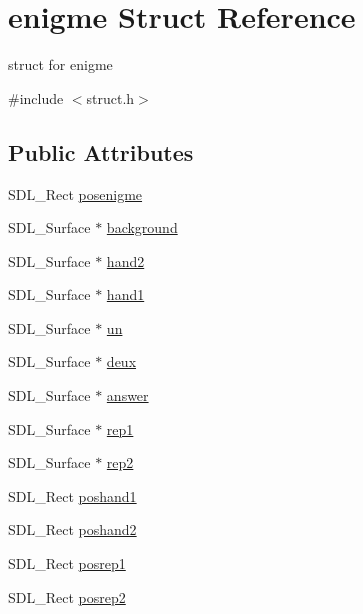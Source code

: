 \hypertarget{structenigme}{}\section{enigme Struct Reference}
\label{structenigme}


struct for enigme  




{\ttfamily \#include $<$struct.\+h$>$}

\subsection*{Public Attributes}
\begin{DoxyCompactItemize}
\item 
S\+D\+L\+\_\+\+Rect \hyperlink{structenigme_ac8828b9af135141d0a37bd4c565330f9}{posenigme}
\item 
S\+D\+L\+\_\+\+Surface $\ast$ \hyperlink{structenigme_afef580eaca259227dac7bbae2d09f8f7}{background}
\item 
S\+D\+L\+\_\+\+Surface $\ast$ \hyperlink{structenigme_ab3814374ba66c4063e6475f9cecf99c0}{hand2}
\item 
S\+D\+L\+\_\+\+Surface $\ast$ \hyperlink{structenigme_a8203d1ceadd8d0cd31122b420cae2aae}{hand1}
\item 
S\+D\+L\+\_\+\+Surface $\ast$ \hyperlink{structenigme_adcbcd8ededa76b3b7fb1e8b80c4475ee}{un}
\item 
S\+D\+L\+\_\+\+Surface $\ast$ \hyperlink{structenigme_ac4aaee9077b4777ca5bf1dcce19f3bc2}{deux}
\item 
S\+D\+L\+\_\+\+Surface $\ast$ \hyperlink{structenigme_a5b9bd47c2083476b1c20af8544b3e58e}{answer}
\item 
S\+D\+L\+\_\+\+Surface $\ast$ \hyperlink{structenigme_a71496547ba4aff7035d278b0db7f3a2a}{rep1}
\item 
S\+D\+L\+\_\+\+Surface $\ast$ \hyperlink{structenigme_a86d84c35e5efd16e4cd5e44f3db5b35b}{rep2}
\item 
S\+D\+L\+\_\+\+Rect \hyperlink{structenigme_a2b242af0e564a9a8717a5b36e84d0385}{poshand1}
\item 
S\+D\+L\+\_\+\+Rect \hyperlink{structenigme_af6e44df3b2452c72d87d5c7681fd160c}{poshand2}
\item 
S\+D\+L\+\_\+\+Rect \hyperlink{structenigme_aa41e1287b7583b5440bc32d04660c5e5}{posrep1}
\item 
S\+D\+L\+\_\+\+Rect \hyperlink{structenigme_ad6b7b05138ce5157e260cad0d1407271}{posrep2}
\item 

\end{DoxyCompactItemize}
